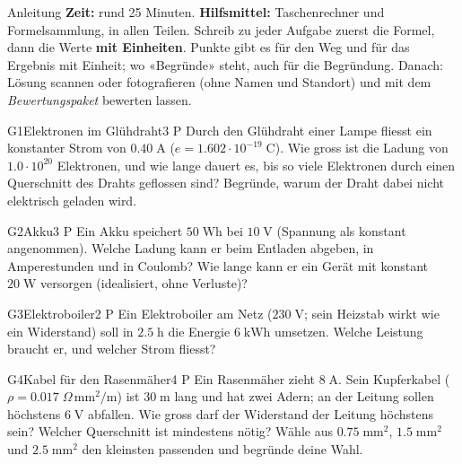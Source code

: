 \documentclass[11pt]{article}
\begin{document}

\begin{lpinfo}{Anleitung}
\textbf{Zeit:} rund 25 Minuten. \textbf{Hilfsmittel:} Taschenrechner und Formelsammlung, in allen Teilen.
Schreib zu jeder Aufgabe zuerst die Formel, dann die Werte \textbf{mit Einheiten}. Punkte gibt es für den Weg
und für das Ergebnis mit Einheit; wo «Begründe» steht, auch für die Begründung.
Danach: Lösung scannen oder fotografieren (ohne Namen und Standort) und mit dem \emph{Bewertungspaket} bewerten lassen.
\end{lpinfo}


\begin{lpaufgabe}{G1}{Elektronen im Glühdraht}{3 P}
Durch den Glühdraht einer Lampe fliesst ein konstanter Strom von $0.40\;\text{A}$ ($e = 1.602 \cdot 10^{-19}\;\text{C}$).
Wie gross ist die Ladung von $1.0 \cdot 10^{20}$ Elektronen, und wie lange dauert es, bis so viele Elektronen
durch einen Querschnitt des Drahts geflossen sind? Begründe, warum der Draht dabei nicht elektrisch geladen wird.
\end{lpaufgabe}

\begin{lpaufgabe}{G2}{Akku}{3 P}
Ein Akku speichert $50\;\text{Wh}$ bei $10\;\text{V}$ (Spannung als konstant angenommen).
Welche Ladung kann er beim Entladen abgeben, in Amperestunden und in Coulomb? Wie lange kann er ein Gerät mit konstant $20\;\text{W}$ versorgen (idealisiert, ohne Verluste)?
\end{lpaufgabe}

\begin{lpaufgabe}{G3}{Elektroboiler}{2 P}
Ein Elektroboiler am Netz ($230\;\text{V}$; sein Heizstab wirkt wie ein Widerstand) soll in $2.5\;\text{h}$ die Energie $6\;\text{kWh}$ umsetzen.
Welche Leistung braucht er, und welcher Strom fliesst?
\end{lpaufgabe}


\begin{lpaufgabe}{G4}{Kabel für den Rasenmäher}{4 P}
Ein Rasenmäher zieht $8\;\text{A}$. Sein Kupferkabel ($\rho = 0.017\;\Omega\,\text{mm}^2/\text{m}$) ist $30\;\text{m}$ lang und hat zwei Adern;
an der Leitung sollen höchstens $6\;\text{V}$ abfallen. Wie gross darf der Widerstand der Leitung höchstens sein?
Welcher Querschnitt ist mindestens nötig? Wähle aus $0.75\;\text{mm}^2$, $1.5\;\text{mm}^2$ und $2.5\;\text{mm}^2$ den kleinsten passenden und begründe deine Wahl.
\end{lpaufgabe}
\end{document}
